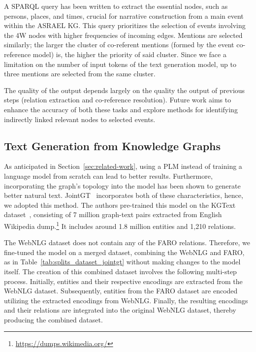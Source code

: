 \documentclass[
]{ceurart}
\begin{document}

A SPARQL query has been written to extract the essential nodes, such as persons, places, and times, crucial for narrative construction from a main event within the ASRAEL KG. This query prioritizes the selection of events involving the 4W nodes with higher frequencies of incoming edges. Mentions are selected similarly; the larger the cluster of co-referent mentions (formed by the event co-reference model) is, the higher the priority of said cluster. Since we face a limitation on the number of input tokens of the text generation model, up to three mentions are selected from the same cluster.

The quality of the output depends largely on the quality the output of previous steps (relation extraction and co-reference resolution). Future work aims to enhance the accuracy of both these tasks and explore methods for identifying indirectly linked relevant nodes to selected events.


\subsection{Text Generation from Knowledge Graphs}
As anticipated in Section~\ref{sec:related-work}, using a PLM instead of training a language model from scratch can lead to better results. Furthermore, incorporating the graph's topology into the model has been shown to generate better natural text. JointGT~\cite{JointGT} incorporates both of these characteristics, hence, we adopted this method. The authors pre-trained this model on the KGText dataset~\cite{KGtext}, consisting of 7 million graph-text pairs extracted from English Wikipedia dump.\footnote{\url{https://dumps.wikimedia.org/}} It includes around 1.8 million entities and 1,210 relations.

The WebNLG dataset does not contain any of the FARO relations. Therefore, we fine-tuned the model on a merged dataset, combining the WebNLG and FARO, as in Table~\ref{tab:splits_dataset_jointgt} without making changes to the model itself. The creation of this combined dataset involves the following multi-step process. Initially, entities and their respective encodings are extracted from the WebNLG dataset. Subsequently, entities from the FARO dataset are encoded utilizing the extracted encodings from WebNLG. Finally, the resulting encodings and their relations are integrated into the original WebNLG dataset, thereby producing the combined dataset.
\end{document}
